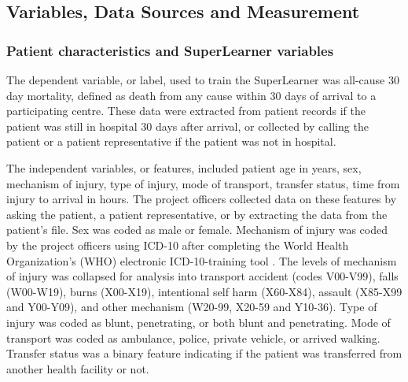 \documentclass[10pt,letterpaper]{article}\usepackage[]{graphicx}\usepackage[]{color}
\begin{document}
\subsection*{Variables, Data Sources and Measurement}
\subsubsection*{Patient characteristics and SuperLearner variables}
The dependent variable, or label, used to train the SuperLearner was all-cause
30 day mortality, defined as death from any cause within 30 days of arrival to a
participating centre. These data were extracted from patient records if the
patient was still in hospital 30 days after arrival, or collected by calling the
patient or a patient representative if the patient was not in hospital.

The independent variables, or features, included patient age in years, sex,
mechanism of injury, type of injury, mode of transport, transfer status, time
from injury to arrival in hours. The project officers collected data on these
features by asking the patient, a patient representative, or by extracting the
data from the patient's file. Sex was coded as male or female. Mechanism of
injury was coded by the project officers using ICD-10 after completing the World
Health Organization's (WHO) electronic ICD-10-training tool \cite{WHOICD}. The
levels of mechanism of injury was collapsed for analysis into transport accident
(codes V00-V99), falls (W00-W19), burns (X00-X19), intentional self harm
(X60-X84), assault (X85-X99 and Y00-Y09), and other mechanism (W20-99, X20-59
and Y10-36). Type of injury was coded as blunt, penetrating, or both blunt and
penetrating. Mode of transport was coded as ambulance, police, private vehicle,
or arrived walking. Transfer status was a binary feature indicating if the
patient was transferred from another health facility or not.
\end{document}
